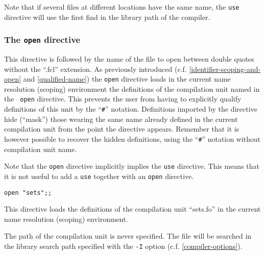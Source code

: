 Note that if several files at different locations have the same name,
the {\tt  use} directive will use the first find in the library path
of the compiler.

\subsubsection{The {\tt open} directive}


This directive is followed by the name of the file to open between
double quotes without the ``.fcl'' extension. As previously introduced
(c.f. \ref{identifier-scoping-and-open} and \ref{qualified-name}) the
{\tt open} directive loads in the current name resolution (scoping)
environment the definitions of the compilation unit named in the {\tt
  open} directive. This prevents the user from having to explicitly
qualify definitions of this unit by the ``{\tt\#}''
notation. Definitions imported by the directive hide (``mask'') those
wearing the same name already defined in the current compilation unit
from the point the directive appears. Remember that it is however
possible to recover the hidden definitions, using the ``{\tt\#}''
notation without compilation unit name.

Note that the {\tt open} directive implicitly implies the {\tt use}
directive. This means that it is not useful to add a {\tt use}
together with an {\tt open} directive.

{\scriptsize
\begin{lstlisting}
open "sets";;
\end{lstlisting}
}This directive loads the definitions of the compilation unit
``sets.fo'' in the current name resolution (scoping) environment.


The path of the compilation unit is never specified. The file
will be searched in the library search path specified with the
{\tt -I} option (c.f. \ref{compiler-options}).




